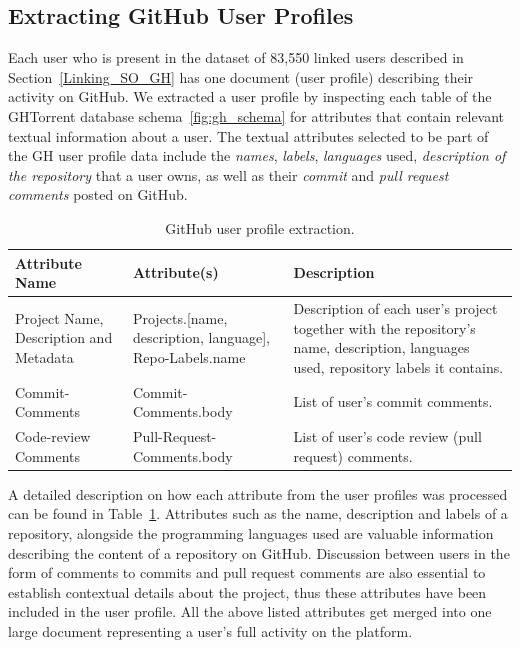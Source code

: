     \subsection{Extracting GitHub User Profiles} \label{GH_userProfileExtraction}
    
        Each user who is present in the dataset of 83,550 linked users described in Section~\ref{Linking_SO_GH} has one document (user profile) describing their activity on GitHub. We extracted a user profile by inspecting each table of the GHTorrent database schema~\ref{fig:gh_schema} for attributes that contain relevant textual information about a user. The textual attributes selected to be part of the GH user profile data include the \textit{names}, \textit{labels}, \textit{languages} used,  \textit{description of the repository} that a user owns, as well as their \textit{commit} and \textit{pull request comments} posted on GitHub. 
        
        \begin{table}[!htbp]
            \centering
            \caption{GitHub user profile extraction.}
            \label{tab:GH_userProfileExtraction}
            \vspace{6pt} %
            \begin{tabular}{|p{3.3cm}|p{3.3cm}|p{7cm}|}
               \toprule
               \textbf{Attribute Name} & \textbf{Attribute(s)} & \textbf{Description} \\
               \toprule
                Project Name, Description and Metadata & Projects.[name, description, language], Repo-Labels.name & Description of each user's project together with the repository's name, description, languages used, repository labels it contains.\\  
                Commit-Comments & Commit-Comments.body & List of user's commit comments.\\
                Code-review Comments & Pull-Request-Comments.body & List of user's code review (pull request) comments. \\
               \bottomrule
            \end{tabular}
        \end{table}
        
        A detailed description on how each attribute from the user profiles was processed can be found in Table~\ref{tab:GH_userProfileExtraction}. Attributes such as the name, description and labels of a repository, alongside the programming languages used are valuable information describing the content of a repository on GitHub. Discussion between users in the form of comments to commits and pull request comments are also essential to establish contextual details about the project, thus these attributes have been included in the user profile. All the above listed attributes get merged into one large document representing a user's full activity on the platform. 
        
